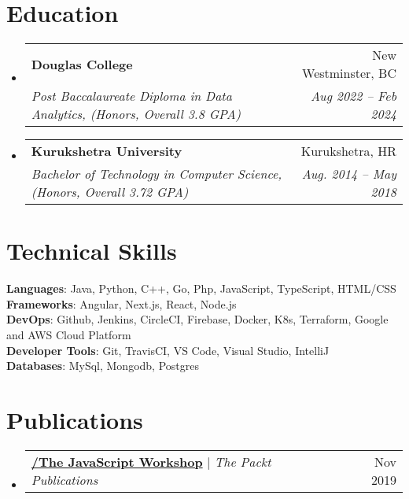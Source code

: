 \documentclass[letterpaper,11pt]{article}
\makeatletter
\newcommand{\resumeSubheading}[4]{
  \vspace{-2pt}\item
    \begin{tabular*}{0.97\textwidth}[t]{l@{\extracolsep{\fill}}r}
      \textbf{#1} & #2 \\
      \textit{\small#3} & \textit{\small #4} \\
    \end{tabular*}\vspace{-7pt}
}
\newcommand{\resumeProjectHeading}[2]{
    \item
    \begin{tabular*}{0.97\textwidth}{l@{\extracolsep{\fill}}r}
      \small#1 & #2 \\
    \end{tabular*}\vspace{-7pt}
}
\newcommand{\resumeSubHeadingListStart}{\begin{itemize}[leftmargin=0.15in, label={}]}
\newcommand{\resumeSubHeadingListEnd}{\end{itemize}}
\makeatother
\begin{document}
\section{Education}
  \resumeSubHeadingListStart
    \resumeSubheading
      {Douglas College}{New Westminster, BC}
      {Post Baccalaureate Diploma in Data Analytics, (Honors, Overall 3.8 GPA)}{Aug 2022 -- Feb 2024}
    \resumeSubheading
      {Kurukshetra University}{Kurukshetra, HR}
      {Bachelor of Technology in Computer Science, (Honors, Overall 3.72 GPA)}{Aug. 2014 -- May 2018}
  \resumeSubHeadingListEnd

%
\section{Technical Skills}
 \begin{itemize}[leftmargin=0.15in, label={}]
    \small{\item{
     \textbf{Languages}{: Java, Python, C++, Go, Php, JavaScript, TypeScript, HTML/CSS} \\
     \textbf{Frameworks}{: Angular, Next.js, React, Node.js} \\
     \textbf{DevOps}{: Github, Jenkins, CircleCI, Firebase, Docker, K8s, Terraform, Google and AWS Cloud Platform} \\
     \textbf{Developer Tools}{: Git, TravisCI, VS Code, Visual Studio, IntelliJ} \\
     \textbf{Databases}{: MySql, Mongodb, Postgres}
    }}
 \end{itemize}

\section{Publications}
\resumeSubHeadingListStart
    \resumeProjectHeading
        {\textbf{\href{https://www.packtpub.com/product/the-javascript-workshop/9781838641917}{/The JavaScript Workshop}} $|$ \emph{The Packt Publications}}{Nov 2019}
        {}{}
\resumeSubHeadingListEnd
 
\end{document}
